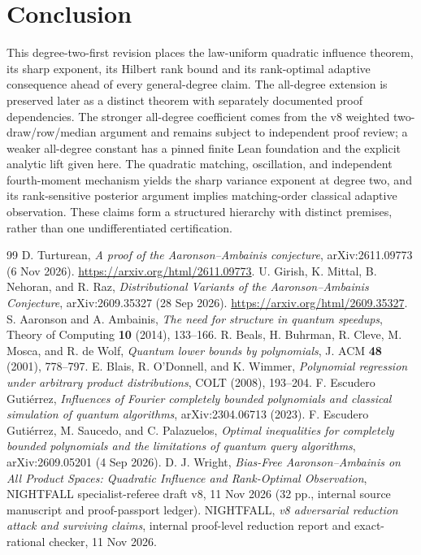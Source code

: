 \documentclass[11pt,letterpaper]{article}
\theoremstyle{definition}\newtheorem{definition}[theorem]{Definition}
\begin{document}
\section{Conclusion}
This degree-two-first revision places the law-uniform quadratic influence theorem, its sharp exponent, its Hilbert rank bound and its rank-optimal adaptive consequence ahead of every general-degree claim. The all-degree extension is preserved later as a distinct theorem with separately documented proof dependencies. The stronger all-degree coefficient comes from the v8 weighted two-draw/row/median argument and remains subject to independent proof review; a weaker all-degree constant has a pinned finite Lean foundation and the explicit analytic lift given here. The quadratic matching, oscillation, and independent fourth-moment mechanism yields the sharp variance exponent at degree two, and its rank-sensitive posterior argument implies matching-order classical adaptive observation. These claims form a structured hierarchy with distinct premises, rather than one undifferentiated certification.

\begin{thebibliography}{99}\setlength{\itemsep}{3pt}
 D. Turturean, \emph{A proof of the Aaronson--Ambainis conjecture}, arXiv:2611.09773 (6 Nov 2026). \url{https://arxiv.org/html/2611.09773}.
 U. Girish, K. Mittal, B. Nehoran, and R. Raz, \emph{Distributional Variants of the Aaronson--Ambainis Conjecture}, arXiv:2609.35327 (28 Sep 2026). \url{https://arxiv.org/html/2609.35327}.
 S. Aaronson and A. Ambainis, \emph{The need for structure in quantum speedups}, Theory of Computing \textbf{10} (2014), 133--166.
 R. Beals, H. Buhrman, R. Cleve, M. Mosca, and R. de Wolf, \emph{Quantum lower bounds by polynomials}, J. ACM \textbf{48} (2001), 778--797.
 E. Blais, R. O'Donnell, and K. Wimmer, \emph{Polynomial regression under arbitrary product distributions}, COLT (2008), 193--204.
 F. Escudero Guti\'errez, \emph{Influences of Fourier completely bounded polynomials and classical simulation of quantum algorithms}, arXiv:2304.06713 (2023).
 F. Escudero Guti\'errez, M. Saucedo, and C. Palazuelos, \emph{Optimal inequalities for completely bounded polynomials and the limitations of quantum query algorithms}, arXiv:2609.05201 (4 Sep 2026).
 D. J. Wright, \emph{Bias-Free Aaronson--Ambainis on All Product Spaces: Quadratic Influence and Rank-Optimal Observation}, NIGHTFALL specialist-referee draft v8, 11 Nov 2026 (32 pp., internal source manuscript and proof-passport ledger).
 NIGHTFALL, \emph{v8 adversarial reduction attack and surviving claims}, internal proof-level reduction report and exact-rational checker, 11 Nov 2026.
\end{thebibliography}
\end{document}
